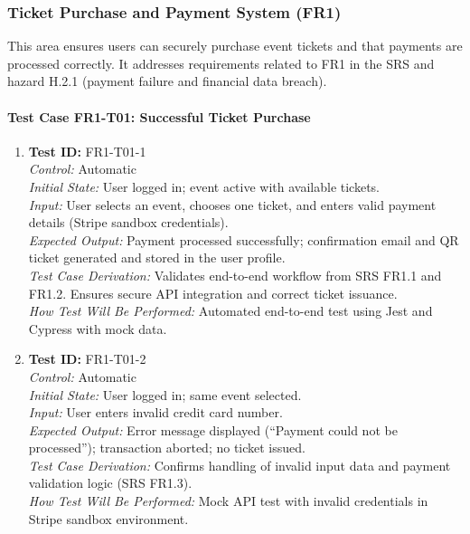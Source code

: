 \documentclass[12pt, titlepage]{article}
\begin{document}
\subsubsection{Ticket Purchase and Payment System (FR1)}

This area ensures users can securely purchase event tickets and that payments are processed correctly. It addresses requirements related to FR1 in the SRS and hazard H.2.1 (payment failure and financial data breach).

\paragraph{Test Case FR1-T01: Successful Ticket Purchase}

\begin{enumerate}\setlength{\itemsep}{1em}
    \item \textbf{Test ID:} FR1-T01-1\\[0.5em]
    \textit{Control:} Automatic\\[0.3em]
    \textit{Initial State:} User logged in; event active with available tickets.\\[0.3em]
    \textit{Input:} User selects an event, chooses one ticket, and enters valid payment details (Stripe sandbox credentials).\\[0.3em]
    \textit{Expected Output:} Payment processed successfully; confirmation email and QR ticket generated and stored in the user profile.\\[0.3em]
    \textit{Test Case Derivation:} Validates end-to-end workflow from SRS FR1.1 and FR1.2. Ensures secure API integration and correct ticket issuance.\\[0.3em]
    \textit{How Test Will Be Performed:} Automated end-to-end test using Jest and Cypress with mock data.

    \item \textbf{Test ID:} FR1-T01-2\\[0.5em]
    \textit{Control:} Automatic\\[0.3em]
    \textit{Initial State:} User logged in; same event selected.\\[0.3em]
    \textit{Input:} User enters invalid credit card number.\\[0.3em]
    \textit{Expected Output:} Error message displayed (“Payment could not be processed”); transaction aborted; no ticket issued.\\[0.3em]
    \textit{Test Case Derivation:} Confirms handling of invalid input data and payment validation logic (SRS FR1.3).\\[0.3em]
    \textit{How Test Will Be Performed:} Mock API test with invalid credentials in Stripe sandbox environment.


\end{enumerate}
\end{document}
